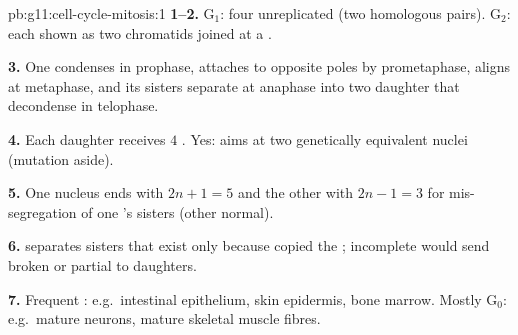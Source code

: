 \begin{solution}{pb:g11:cell-cycle-mitosis:1}
\textbf{1--2.} G$_1$: four unreplicated  (two homologous pairs).
G$_2$: each  shown as two chromatids joined at a .

\textbf{3.} One  condenses in prophase, attaches to opposite poles by
prometaphase, aligns at metaphase, and its sisters separate at anaphase into
two daughter  that decondense in telophase.

\textbf{4.} Each daughter receives $4$ . Yes:  aims at two
genetically equivalent  nuclei (mutation aside).

\textbf{5.} One nucleus ends with $2n+1 = 5$  and the other with
$2n-1 = 3$ for mis-segregation of one 's sisters (other 
normal).

\textbf{6.}  separates sisters that exist only because  copied
the ; incomplete  would send broken or partial  to
daughters.

\textbf{7.} Frequent : e.g.\ intestinal epithelium, skin epidermis,
bone marrow. Mostly G$_0$: e.g.\ mature neurons, mature skeletal muscle fibres.
\end{solution}
